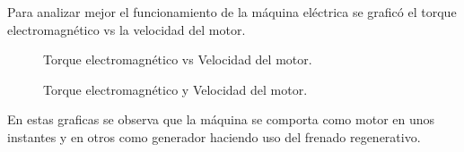 \documentclass[a4paper, 10pt, onecolumn,journal]{ieeeconf}
\begin{document}
Para analizar mejor el funcionamiento de la máquina eléctrica se graficó el torque electromagnético vs la velocidad del motor. 

\begin{figure}[H]
	\centering
	\begin{adjustbox}{max width=\columnwidth}
	\end{adjustbox}
	\caption{Torque electromagnético vs Velocidad del motor.}
	\label{Torque electromagnético vs Velocidad del motor}
\end{figure}
\begin{figure}[H]
	\centering
	\begin{adjustbox}{max width=\columnwidth}
	\end{adjustbox}
	\caption{Torque electromagnético y Velocidad del motor.}
	\label{Torque electromagnético y Velocidad del motor}
\end{figure}
En estas graficas se observa que la máquina se comporta como motor en unos instantes y en otros como generador haciendo uso del frenado regenerativo.
\end{document}
